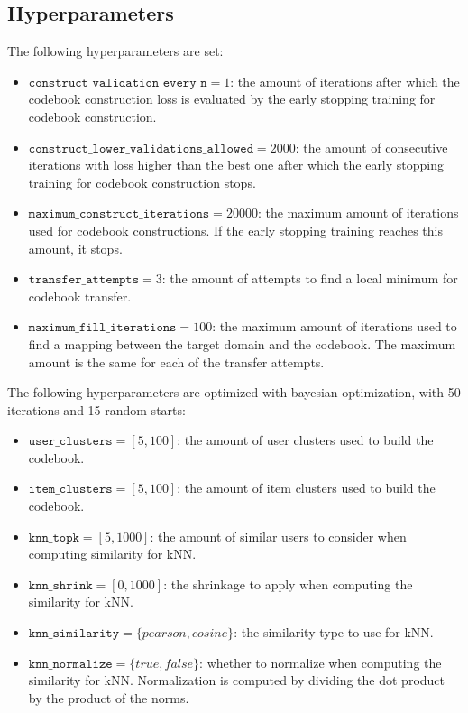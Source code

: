 \subsection{Hyperparameters}

The following hyperparameters are set:
\begin{itemize}
\item $\texttt{construct\_validation\_every\_n} = 1$: the amount of iterations after which the codebook construction loss is evaluated by the early stopping training for codebook construction.
\item $\texttt{construct\_lower\_validations\_allowed} = 2000$: the amount of consecutive iterations with loss higher than the best one after which the early stopping training for codebook construction stops.
\item $\texttt{maximum\_construct\_iterations} = 20000$: the maximum amount of iterations used for codebook constructions. If the early stopping training reaches this amount, it stops.
\item $\texttt{transfer\_attempts} = 3$: the amount of attempts to find a local minimum for codebook transfer.
\item $\texttt{maximum\_fill\_iterations} = 100$: the maximum amount of iterations used to find a mapping between the target domain and the codebook. The maximum amount is the same for each of the transfer attempts.
\end{itemize}
The following hyperparameters are optimized with bayesian optimization, with 50 iterations and 15 random starts:
\begin{itemize}
\item $\texttt{user\_clusters} = [5,100]$: the amount of user clusters used to build the codebook.
\item $\texttt{item\_clusters} = [5,100]$: the amount of item clusters used to build the codebook.
\item $\texttt{knn\_topk} = [5,1000]$: the amount of similar users to consider when computing similarity for kNN.
\item $\texttt{knn\_shrink} = [0,1000]$: the shrinkage to apply when computing the similarity for kNN.
\item $\texttt{knn\_similarity} = \{pearson,cosine\}$: the similarity type to use for kNN.
\item $\texttt{knn\_normalize} = \{true,false\}$: whether to normalize when computing the similarity for kNN. Normalization is computed by dividing the dot product by the product of the norms.
\end{itemize}



